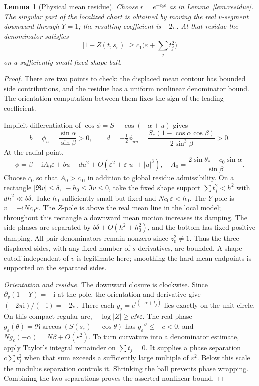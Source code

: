 \documentclass[11pt]{article}
\numberwithin{equation}{section}
\newtheorem{lemma}[theorem]{Lemma}
\theoremstyle{definition}
\newcommand{\ii}{\mathrm i}
\newcommand{\eps}{\varepsilon}
\newcommand{\se}{s_\varepsilon}
\begin{document}
\begin{lemma}[Physical mean residue]\label{lem:mean}
Choose \(r=e^{-c_0\eps}\) as in Lemma~\ref{lem:residue}. The singular
part of the localized chart is obtained by moving the real \(v\)-segment
downward through \(Y=1\); the resulting coefficient is \(+2\pi\).
At that residue the denominator satisfies
\[
 |1-Z(t,\se)|\ge c_1\bigl(\eps+\textstyle\sum_jt_j^2\bigr)
\]
on a sufficiently small fixed shape ball.
\end{lemma}
\begin{proof}
There are two points to check: the displaced mean contour has bounded side contributions, and the residue has a uniform nonlinear denominator bound. The orientation computation between them fixes the sign of the leading coefficient.

Implicit differentiation of \(\cos\phi=S-\cos(-\alpha+u)\) gives
\[
 b=\phi_u=\frac{\sin\alpha}{\sin\beta}>0,\qquad
 d=-\tfrac12\phi_{uu}
   =\frac{S_*(1-\cos\alpha\cos\beta)}{2\sin^3\beta}>0.
\]
At the radial point,
\[
 \phi=\beta-\ii A_0\eps+bu-du^2
       +O(\eps^2+\eps|u|+|u|^3),\quad
 A_0=\frac{2\sin\theta_*-c_0\sin\alpha}{\sin\beta}.
\]
Choose \(c_0\) so that \(A_0>c_0\), in addition to global residue
admissibility. On a rectangle \(|\Re v|\le\delta,\ -h_0\le\Im v\le0\),
take the fixed shape support \(\sum t_j^2<h^2\) with \(dh^2\ll b\delta\).
Take \(h_0\) sufficiently small but fixed and \(Nc_0\eps<h_0\).
The \(Y\)-pole is \(v=-\ii Nc_0\eps\). The \(Z\)-pole is above the
real mean line in the local model; throughout this rectangle a downward
mean motion increases its damping. The side phases are separated by
\(b\delta+O(h^2+h_0^2)\), and the bottom has fixed positive damping.
All pair denominators remain nonzero since \(z_0^2\ne1\).
Thus the three displaced sides, with any fixed number of \(s\)-derivatives,
are bounded. A shape cutoff independent of \(v\) is legitimate here;
smoothing the hard mean endpoints is supported on the separated sides.

\smallskip\noindent\textit{Orientation and residue.}
The downward closure is clockwise. Since
\(\partial_v(1-Y)=-\ii\) at the pole, the orientation and derivative
give \((-2\pi\ii)/(-\ii)=+2\pi\).
There each \(y_j=e^{\ii(-\alpha+t_j)}\) lies exactly on the unit circle.
On this compact regular arc, \(-\log|Z|\ge cN\eps\).
The real phase \(g_\eps(\theta)=\Re\arccos(S(\se)-\cos\theta)\) has
\(g_\eps''\le-c<0\), and
\(N g_\eps(-\alpha)=N\beta+O(\eps^2)\).
To turn curvature into a denominator estimate, apply Taylor's integral
remainder on \(\sum t_j=0\). It supplies a phase separation \(c\sum t_j^2\) when that sum exceeds a sufficiently large
multiple of \(\eps^2\). Below this scale the modulus separation
controls it. Shrinking the ball prevents phase wrapping. Combining
the two separations proves the asserted nonlinear bound.
\end{proof}
\end{document}

